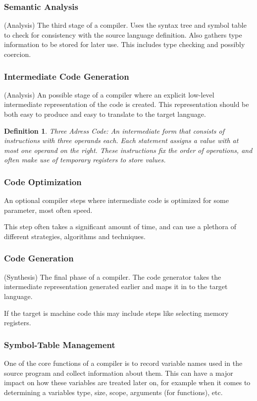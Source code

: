 \documentclass[titlepage]{article}
\newtheorem{definition}{Definition}
\begin{document}
\subsubsection*{Semantic Analysis}
(Analysis)
The third stage of a compiler. Uses the syntax tree and symbol table to check for consistency with the source language definition. Also gathers type information to be stored for later use.
This includes type checking and possibly coercion.

\subsubsection*{Intermediate Code Generation}
(Analysis)
An possible stage of a compiler where an explicit low-level intermediate representation of the code is created. This representation should be both easy to produce and easy to translate to the target language.
\begin{definition}
    \emph{Three Adress Code}: An intermediate form that consists of instructions with three operands each. Each statement assigns a value with at most one operand on the right. These instructions fix the order of operations, and often make use of temporary registers to store values.
\end{definition}
\subsubsection*{Code Optimization}
An optional compiler steps where intermediate code is optimized for some parameter, most often speed.

This step often takes a significant amount of time, and can use a plethora of different strategies, algorithms and techniques.

\subsubsection*{Code Generation}
(Synthesis)
The final phase of a compiler. The code generator takes the intermediate representation generated earlier and maps it in to the target language.

If the target is machine code this may include steps like selecting memory registers.

\subsubsection*{Symbol-Table Management}
One of the core functions of a compiler is to record variable names used in the source program and collect information about them. This can have a major impact on how these variables are treated later on, for example when it comes to determining a variables type, size, scope, arguments (for functions), etc.
\end{document}
